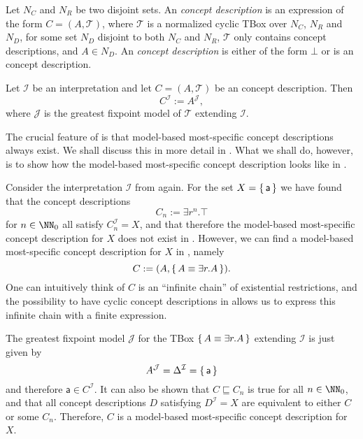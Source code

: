 \begin{Definition}
  \label{def:ELgfpbot-concept-descriptions-and-their-semantics}
  Let $N_C$ and $N_R$ be two disjoint sets.  An \emph{\ELgfp concept description} is an
  expression of the form $C = (A, \mathcal{T})$, where $\mathcal{T}$ is a normalized
  cyclic TBox over $N_C$, $N_R$ and $N_D$, for some set $N_D$ disjoint to both $N_C$ and
  $N_R$, $\mathcal{T}$ only contains \EL concept descriptions, and $A \in N_D$.  An
  \emph{\ELgfpbot concept description} is either of the form $\bot$ or is an \ELgfp
  concept description.

  Let $\mathcal{I}$ be an interpretation and let $C = (A, \mathcal{T})$ be an \ELgfpbot
  concept description.  Then
  \begin{equation*}
    C^{\mathcal{I}} := A^{\mathcal{J}},
  \end{equation*}
  where $\mathcal{J}$ is the greatest fixpoint model of $\mathcal{T}$ extending
  $\mathcal{I}$.
\end{Definition}

The crucial feature of \ELgfpbot is that model-based most-specific concept descriptions
always exist.  We shall discuss this in more detail in .  What we
shall do, however, is to show how the model-based most-specific concept description looks
like in .

\begin{Example}
  \label{expl:mmsc-exist-in-ELgfpbot}
  Consider the interpretation $\mathcal{I}$ from 
  again.  For the set $X = {\{\, \mathsf{a} \,\}}$ we have found that the concept descriptions
  \begin{equation*}
    C_n := \exists r^n. \top
  \end{equation*}
  for $n \in \NN_0$ all satisfy $C_n^{\mathcal{I}} = X$, and that therefore the
  model-based most-specific concept description for $X$ does not exist in \ELbot.
  However, we can find a model-based most-specific concept description for $X$ in
  \ELgfpbot, namely
  \begin{equation*}
    C := (A, {\{\, A \equiv \exists r. A \,\}}).
  \end{equation*}
  One can intuitively think of $C$ is an ``infinite chain'' of existential restrictions,
  and the possibility to have cyclic concept descriptions in \ELgfpbot allows us to
  express this infinite chain with a finite expression.

  The greatest fixpoint model $\mathcal{J}$ for the TBox ${\{\, A \equiv \exists r. A \,\}}$
  extending $\mathcal{I}$ is just given by
  \begin{equation*}
    A^{\mathcal{J}} = \Delta^{\mathcal{I}} = {\{\, \mathsf{a} \,\}}
  \end{equation*}
  and therefore $\mathsf{a} \in C^{\mathcal{I}}$.  It can also be shown that $C
  \sqsubseteq C_n$ is true for all $n \in \NN_0$, and that all \ELgfpbot concept
  descriptions $D$ satisfying $D^{\mathcal{I}} = X$ are equivalent to either $C$ or some
  $C_n$.  Therefore, $C$ is a model-based most-specific concept description for $X$.
\end{Example}

